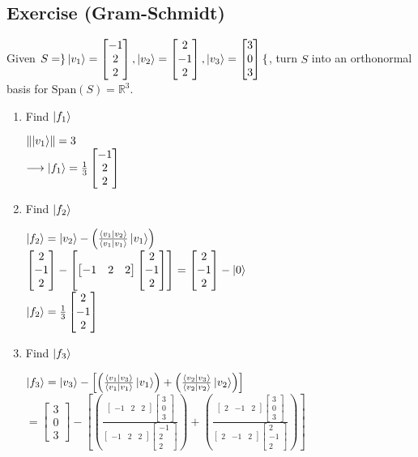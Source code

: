 \documentclass[12pt]{article}
\theoremstyle{plain}
\theoremstyle{nonumberplain}
\theoremstyle{plain}
\theoremstyle{nonumberplain}
\newcommand\1{{\bf 1}}
\newcommand{\bmat}[1]{\begin{bmatrix*} #1 \end{bmatrix*}} %
\newcommand{\R}{\mathbb{R}} %
\newcommand{\<}{\left\langle}
\renewcommand{\>}{\right\rangle}
\newcommand{\lp}{\left(}
\newcommand{\rp}{\right)}
\newcommand{\norm}[1]{\left\lVert#1\right\rVert} %
\newcommand{\inp}[2]{\left\langle#1\mid #2\right\rangle} %
\newcommand{\spn}[1]{\text{Span}\lp #1\rp} %
\begin{document}
\subsection{Exercise (Gram-Schmidt)}
Given $S=\rbrace\ket{v_1}=\bmat{-1 \\ 2 \\ 2}, \ket{v_2}=\bmat{2 \\ -1 \\ 2}, \ket{v_3}=\bmat{3 \\ 0 \\ 3}\lbrace$, turn $S$ into an orthonormal basis for $\spn{S}=\R^3$.
\begin{enumerate}
\item Find $\ket{f_1}$
\begin{center}
$\norm{\ket{v_1}}=3$ \\
$\longrightarrow\ket{f_1}=\frac{1}{3}\bmat{-1 \\ 2 \\ 2}$ \\
\end{center}
\item Find $\ket{f_2}$
\begin{center}
$\ket{f_2}=\ket{v_2}-\left(\frac{\inp{v_1}{v_2}}{\inp{v_1}{v_1}}\ket{v_1}\right)$ \\
$\bmat{2 \\ -1 \\ 2}-\left[ \bmat{-1 & 2 & 2} \bmat{2 \\ -1 \\ 2} \right] =\bmat{2 \\ -1 \\ 2}-\ket{0}$ \\
$\ket{f_2}=\frac{1}{3}\bmat{2 \\ -1 \\ 2}$
\end{center}
\item Find $\ket{f_3}$
\begin{center}
$\ket{f_3}=\ket{v_3}-\left[ \left( \frac{\inp{v_1}{v_3}}{\inp{v_1}{v_1}}\ket{v_1} \right) + \left( \frac{\inp{v_2}{v_3}}{\inp{v_2}{v_2}}\ket{v_2} \right)  \right]$ \\
$=\bmat{3 \\ 0 \\ 3}-\left[ \left( \frac{\bmat{-1 & 2 & 2}\bmat{3 \\ 0 \\ 3}}{\bmat{-1 & 2 & 2}\bmat{-1 \\ 2 \\ 2}} \right) + \left( \frac{\bmat{2 & -1 & 2}\bmat{3 \\ 0 \\ 3}}{\bmat{2 & -1 & 2}\bmat{2 \\ -1 \\ 2}} \right) \right]$ \\

\end{center}
\end{enumerate}
\end{document}
